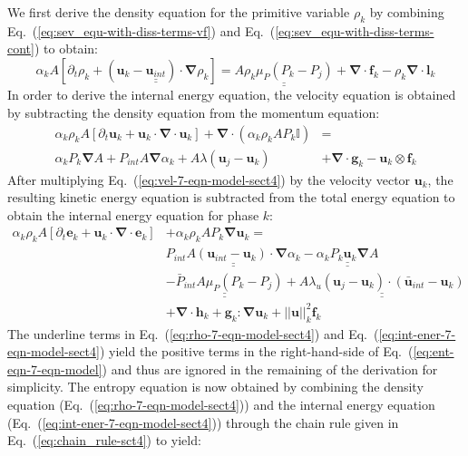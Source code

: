 \documentclass[preprint,10pt]{elsarticle}
\renewcommand{\div}{\mbold{\nabla}\! \cdot \!}
\newcommand{\grad}{\mbold{\nabla}}
\newcommand{\mbold}[1]{\boldsymbol#1}
\newcommand{\eqt}[1]{Eq.~(\ref{#1})}                     %
\begin{document}
%
We first derive the density equation for the primitive variable $\rho_k$ by combining \eqt{eq:sev_equ-with-diss-terms-vf} and \eqt{eq:sev_equ-with-diss-terms-cont} to obtain:
%
\begin{equation}\label{eq:rho-7-eqn-model-sect4}
\alpha_k A \left[ \partial_t \rho_k + \left( \mbold u_k - \underline{\underline{\mbold u_{int}}} \right) \cdot \grad \rho_k \right] = \underline{\underline{A \rho_k \mu_P \left( P_k - P_j \right)}} + \div \mbold f_k - \rho_k \div \mbold l_k
\end{equation}
%
In order to derive the internal energy equation, the velocity equation is obtained by subtracting the density equation from the momentum equation:
%
\begin{align}\label{eq:vel-7-eqn-model-sect4}
\alpha_k \rho_k  A \left[ \partial_t \mbold u_k + \mbold u_k \cdot \div \mbold u_k \right]  + \div \left( \alpha_k \rho_k A P_k \mathbb{I} \right) &=\nonumber\\
\alpha_k P_k \grad A + P_{int} A \grad \alpha_k + A \lambda \left( \mbold u_j - \mbold u_k \right) &+ \div \mbold g_k - \mbold u_k \otimes \mbold f_k
\end{align}
%
After multiplying \eqt{eq:vel-7-eqn-model-sect4} by the velocity vector $\mbold u_k$, the resulting kinetic energy equation is subtracted from the total energy equation to obtain the internal energy equation for phase $k$:
%
\begin{align}\label{eq:int-ener-7-eqn-model-sect4}
\alpha_k \rho_k  A \left[ \partial_t \mbold e_k + \mbold u_k \cdot \div \mbold e_k \right]  &+ \alpha_k \rho_k A P_k \grad \mbold u_k =\nonumber\\
&\underline{\underline{P_{int} A \left(\mbold u_{int}-\mbold u_k \right) \cdot \grad \alpha_k}} -  \underline{\underline{\alpha_k P_k \mbold u_k \grad A}} \nonumber \\ 
&\underline{\underline{-\bar{P}_{int} A \mu_P \left(P_k-P_j \right)}} + \underline{\underline{A \lambda_u \left(\mbold u_j-\mbold u_k  \right) \cdot \left(\bar{\mbold u}_{int}- \mbold u_k \right)}}\nonumber \\
&+ \div \mbold h_k + \mbold g_k : \grad \mbold u_k + || \mbold u ||^2_k \mbold f_k
\end{align}
%
The underline terms in \eqt{eq:rho-7-eqn-model-sect4} and \eqt{eq:int-ener-7-eqn-model-sect4} yield the positive terms in the right-hand-side of \eqt{eq:ent-eqn-7-eqn-model} and thus are ignored in the remaining of the derivation for simplicity. The entropy equation is now obtained by combining the density equation (\eqt{eq:rho-7-eqn-model-sect4}) and the internal energy equation (\eqt{eq:int-ener-7-eqn-model-sect4}) through the chain rule given in \eqt{eq:chain_rule-sct4} to yield:
\end{document}
